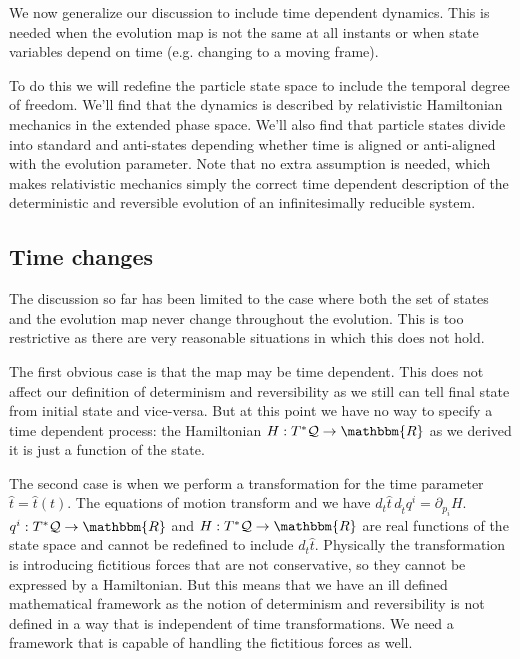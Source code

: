 \documentclass[aps,pra,10pt,twocolumn,floatfix,nofootinbib]{revtex4-1}
\numberwithin{equation}{section}
\theoremstyle{definition}
\begin{document}
We now generalize our discussion to include time dependent dynamics. This is needed when the evolution map is not the same at all instants or when state variables depend on time (e.g. changing to a moving frame).

To do this we will redefine the particle state space to include the temporal degree of freedom. We'll find that the dynamics is described by relativistic Hamiltonian mechanics in the extended phase space. We'll also find that particle states divide into standard and anti-states depending whether time is aligned or anti-aligned with the evolution parameter. Note that no extra assumption is needed, which makes relativistic mechanics simply the correct time dependent description of the deterministic and reversible evolution of an infinitesimally reducible system.

\subsection{Time changes}

The discussion so far has been limited to the case where both the set of states and the evolution map never change throughout the evolution. This is too restrictive as there are very reasonable situations in which this does not hold.

The first obvious case is that the map may be time dependent. This does not affect our definition of determinism and reversibility as we still can tell final state from initial state and vice-versa. But at this point we have no way to specify a time dependent process: the Hamiltonian $H: T^*\mathcal{Q} \rightarrow \mathbbm{R}$ as we derived it is just a function of the state.

The second case is when we perform a transformation for the time parameter $\hat{t}=\hat{t}(t)$. The equations of motion transform and we have $d_{t}\hat{t} \, d_{\hat{t}}q^i = \partial_{p_i} H$. $q^i: T^*\mathcal{Q} \rightarrow \mathbbm{R}$ and $H: T^*\mathcal{Q} \rightarrow \mathbbm{R}$ are real functions of the state space and cannot be redefined to include $d_{t}\hat{t}$. Physically the transformation is introducing fictitious forces that are not conservative, so they cannot be expressed by a Hamiltonian. But this means that we have an ill defined mathematical framework as the notion of determinism and reversibility is not defined in a way that is independent of time transformations. We need a framework that is capable of handling the fictitious forces as well.
\end{document}
